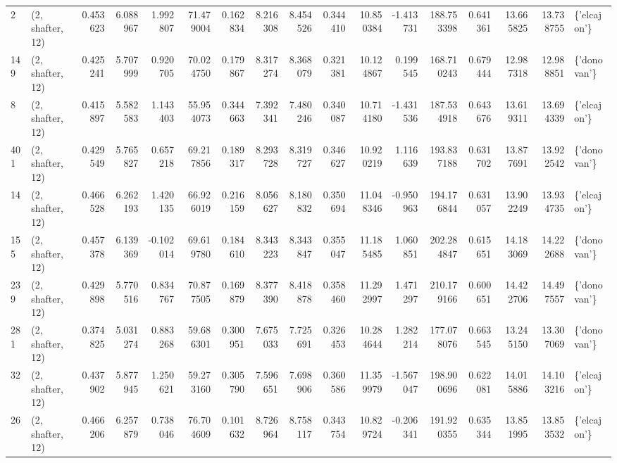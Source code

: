 \begin{tabular}{llrrrrrrrrrrrrrrl}
2   &  (2, shafter, 12) &   0.453623 &   6.088967 &   1.992807 &    71.479004 &   0.162834 &   8.216308 &   8.454526 &  0.344410 &  10.850384 &  -1.413731 &   188.753398 &   0.641361 &  13.665825 &  13.738755 &  \{'elcajon'\} \\
149 &  (2, shafter, 12) &   0.425241 &   5.707999 &   0.920705 &    70.024750 &   0.179867 &   8.317274 &   8.368079 &  0.321381 &  10.124867 &   0.199545 &   168.710243 &   0.679444 &  12.987318 &  12.988851 &  \{'donovan'\} \\
8   &  (2, shafter, 12) &   0.415897 &   5.582583 &   1.143403 &    55.954073 &   0.344663 &   7.392341 &   7.480246 &  0.340087 &  10.714180 &  -1.431536 &   187.534918 &   0.643676 &  13.619311 &  13.694339 &  \{'elcajon'\} \\
401 &  (2, shafter, 12) &   0.429549 &   5.765827 &   0.657218 &    69.217856 &   0.189317 &   8.293728 &   8.319727 &  0.346627 &  10.920219 &   1.116639 &   193.837188 &   0.631702 &  13.877691 &  13.922542 &  \{'donovan'\} \\
14  &  (2, shafter, 12) &   0.466528 &   6.262193 &   1.420135 &    66.926019 &   0.216159 &   8.056627 &   8.180832 &  0.350694 &  11.048346 &  -0.950963 &   194.176844 &   0.631057 &  13.902249 &  13.934735 &  \{'elcajon'\} \\
155 &  (2, shafter, 12) &   0.457378 &   6.139369 &  -0.102014 &    69.619780 &   0.184610 &   8.343223 &   8.343847 &  0.355047 &  11.185485 &   1.060851 &   202.284847 &   0.615651 &  14.183069 &  14.222688 &  \{'donovan'\} \\
239 &  (2, shafter, 12) &   0.429898 &   5.770516 &   0.834767 &    70.877505 &   0.169879 &   8.377390 &   8.418878 &  0.358460 &  11.292997 &   1.471297 &   210.179166 &   0.600651 &  14.422706 &  14.497557 &  \{'donovan'\} \\
281 &  (2, shafter, 12) &   0.374825 &   5.031274 &   0.883268 &    59.686301 &   0.300951 &   7.675033 &   7.725691 &  0.326453 &  10.284644 &   1.282214 &   177.078076 &   0.663545 &  13.245150 &  13.307069 &  \{'donovan'\} \\
32  &  (2, shafter, 12) &   0.437902 &   5.877945 &   1.250621 &    59.273160 &   0.305790 &   7.596651 &   7.698906 &  0.360586 &  11.359979 &  -1.567047 &   198.900696 &   0.622081 &  14.015886 &  14.103216 &  \{'elcajon'\} \\
26  &  (2, shafter, 12) &   0.466206 &   6.257879 &   0.738046 &    76.704609 &   0.101632 &   8.726964 &   8.758117 &  0.343754 &  10.829724 &  -0.206341 &   191.920355 &   0.635344 &  13.851995 &  13.853532 &  \{'elcajon'\} \\

\end{tabular}
